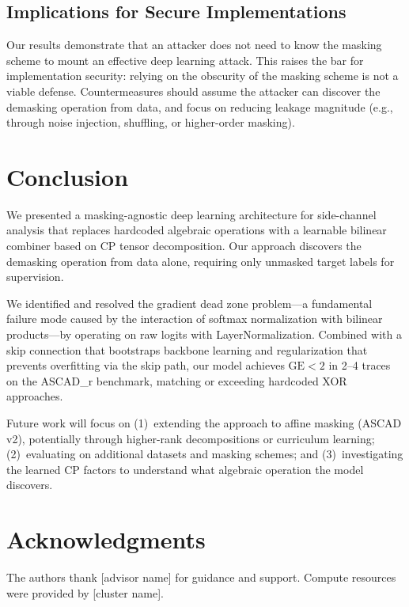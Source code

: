 \documentclass[submission]{iacrtrans}
\newcommand{\GE}{\mathrm{GE}}
\begin{document}
\subsection{Implications for Secure Implementations}

Our results demonstrate that an attacker does not need to know the masking scheme to mount an effective deep learning attack. This raises the bar for implementation security: relying on the obscurity of the masking scheme is not a viable defense. Countermeasures should assume the attacker can discover the demasking operation from data, and focus on reducing leakage magnitude (e.g., through noise injection, shuffling, or higher-order masking).


\section{Conclusion}\label{sec:conclusion}

We presented a masking-agnostic deep learning architecture for side-channel analysis that replaces hardcoded algebraic operations with a learnable bilinear combiner based on CP tensor decomposition. Our approach discovers the demasking operation from data alone, requiring only unmasked target labels for supervision.

We identified and resolved the gradient dead zone problem---a fundamental failure mode caused by the interaction of softmax normalization with bilinear products---by operating on raw logits with LayerNormalization. Combined with a skip connection that bootstraps backbone learning and regularization that prevents overfitting via the skip path, our model achieves $\GE < 2$ in 2--4 traces on the ASCAD\_r benchmark, matching or exceeding hardcoded XOR approaches.

Future work will focus on (1)~extending the approach to affine masking (ASCAD v2), potentially through higher-rank decompositions or curriculum learning; (2)~evaluating on additional datasets and masking schemes; and (3)~investigating the learned CP factors to understand what algebraic operation the model discovers.

\section*{Acknowledgments}

The authors thank [advisor name] for guidance and support. Compute resources were provided by [cluster name].



\end{document}
